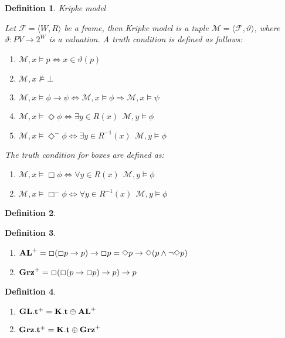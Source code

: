 \documentclass[a4paper]{article}
\theoremstyle{defin}
\newtheorem{defin}{Definition}
\theoremstyle{theorem}
\theoremstyle{prop}
\theoremstyle{lemma}
\theoremstyle{ex}
\theoremstyle{col}
\newcommand{\BoxM}{\Box^{-}}
\newcommand{\DiamondM}{\Diamond^{-}}
\begin{document}
\begin{defin} Kripke model

  Let $\mathcal{F} = \langle W, R \rangle$ be a frame, then Kripke model is a tuple $\mathcal{M} = \langle \mathcal{F}, \vartheta \rangle$, where $\vartheta : PV \to 2^W$ is a valuation. A truth condition is defined as follows:

  \begin{enumerate}
    \item $\mathcal{M}, x \models p \Leftrightarrow x \in \vartheta(p)$
    \item $\mathcal{M}, x \nvDash \bot$
    \item $\mathcal{M}, x \models \phi \to \psi \Leftrightarrow \mathcal{M}, x \models \phi \Rightarrow \mathcal{M}, x \models \psi$
    \item $\mathcal{M}, x \models \Diamond \phi \Leftrightarrow \exists y \in R(x) \:\: \mathcal{M}, y \models \phi$
    \item $\mathcal{M}, x \models \DiamondM \phi \Leftrightarrow \exists y \in R^{-1}(x) \:\: \mathcal{M}, y \models \phi$
  \end{enumerate}

  The truth condition for boxes are defined as:

  \begin{enumerate}
    \item $\mathcal{M}, x \models \Box \phi \Leftrightarrow \forall y \in R(x) \:\: \mathcal{M}, y \models \phi$
    \item $\mathcal{M}, x \models \BoxM \phi \Leftrightarrow \forall y \in R^{-1}(x) \:\: \mathcal{M}, y \models \phi$
  \end{enumerate}
\end{defin}

\begin{defin}

\end{defin}

\begin{defin}
$ $

  \begin{enumerate}
    \item ${\bf AL}^{+} = \Box (\Box p \to p) \to \Box p = \Diamond p \to \Diamond (p \land \neg \Diamond p)$
    \item ${\bf Grz}^{+} = \Box (\Box (p \to \Box p) \to p) \to p$
  \end{enumerate}
\end{defin}

\begin{defin}
$ $

  \begin{enumerate}
    \item ${\bf GL}.{\bf t}^{+} = {\bf K}.{\bf t} \oplus {\bf AL}^{+}$
    \item ${\bf Grz}.{\bf t}^{+} = {\bf K}.{\bf t} \oplus {\bf Grz}^{+}$
  \end{enumerate}
\end{defin}
\end{document}
